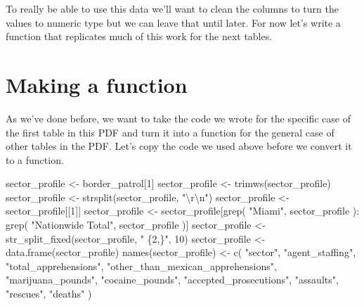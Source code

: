 \documentclass[
]{krantz}
\makeatletter
\newenvironment{Shaded}{\begin{snugshade}}{\end{snugshade}}
\newcommand{\DecValTok}[1]{\textcolor[rgb]{0.06,0.06,0.06}{#1}}
\newcommand{\FunctionTok}[1]{\textcolor[rgb]{0,0,0}{#1}}
\newcommand{\NormalTok}[1]{#1}
\newcommand{\OtherTok}[1]{\textcolor[rgb]{0.37,0.37,0.37}{#1}}
\newcommand{\SpecialCharTok}[1]{\textcolor[rgb]{0,0,0}{#1}}
\newcommand{\StringTok}[1]{\textcolor[rgb]{0.5,0.5,0.5}{#1}}
\newenvironment{kframe}{%
\medskip{}
\setlength{\fboxsep}{.8em}
 \def\at@end@of@kframe{}%
 \ifinner\ifhmode%
  \def\at@end@of@kframe{\end{minipage}}%
  \begin{minipage}{\columnwidth}%
 \fi\fi%
 \def\FrameCommand##1{\hskip\@totalleftmargin \hskip-\fboxsep
 \colorbox{shadecolor}{##1}\hskip-\fboxsep
     \hskip-\linewidth \hskip-\@totalleftmargin \hskip\columnwidth}%
 \MakeFramed {\advance\hsize-\width
   \@totalleftmargin\z@ \linewidth\hsize
   \@setminipage}}%
 {\par\unskip\endMakeFramed%
 \at@end@of@kframe}
\renewenvironment{Shaded}{\begin{kframe}}{\end{kframe}}
\makeatother
\begin{document}
To really be able to use this data we'll want to clean the
columns to turn the values to numeric type but we can leave
that until later. For now let's write a function that
replicates much of this work for the next tables.

\hypertarget{making-a-function}{%
\section{Making a function}\label{making-a-function}}

As we've done before, we want to take the code we wrote for
the specific case of the first table in this PDF and turn it
into a function for the general case of other tables in the
PDF. Let's copy the code we used above before we convert it
to a function.

\begin{Shaded}
\begin{Highlighting}[]
\NormalTok{sector\_profile }\OtherTok{\textless{}{-}}\NormalTok{ border\_patrol[}\DecValTok{1}\NormalTok{]}
\NormalTok{sector\_profile }\OtherTok{\textless{}{-}} \FunctionTok{trimws}\NormalTok{(sector\_profile)}
\NormalTok{sector\_profile }\OtherTok{\textless{}{-}} \FunctionTok{strsplit}\NormalTok{(sector\_profile, }\StringTok{"}\SpecialCharTok{\textbackslash{}r\textbackslash{}n}\StringTok{"}\NormalTok{)}
\NormalTok{sector\_profile }\OtherTok{\textless{}{-}}\NormalTok{ sector\_profile[[}\DecValTok{1}\NormalTok{]]}
\NormalTok{sector\_profile }\OtherTok{\textless{}{-}}\NormalTok{ sector\_profile[}\FunctionTok{grep}\NormalTok{(}
  \StringTok{"Miami"}\NormalTok{,}
\NormalTok{  sector\_profile}
\NormalTok{)}\SpecialCharTok{:}
\FunctionTok{grep}\NormalTok{(}
  \StringTok{"Nationwide Total"}\NormalTok{,}
\NormalTok{  sector\_profile}
\NormalTok{)]}
\NormalTok{sector\_profile }\OtherTok{\textless{}{-}} \FunctionTok{str\_split\_fixed}\NormalTok{(sector\_profile, }\StringTok{" \{2,\}"}\NormalTok{, }\DecValTok{10}\NormalTok{)}
\NormalTok{sector\_profile }\OtherTok{\textless{}{-}} \FunctionTok{data.frame}\NormalTok{(sector\_profile)}
\FunctionTok{names}\NormalTok{(sector\_profile) }\OtherTok{\textless{}{-}} \FunctionTok{c}\NormalTok{(}
  \StringTok{"sector"}\NormalTok{,}
  \StringTok{"agent\_staffing"}\NormalTok{,}
  \StringTok{"total\_apprehensions"}\NormalTok{,}
  \StringTok{"other\_than\_mexican\_apprehensions"}\NormalTok{,}
  \StringTok{"marijuana\_pounds"}\NormalTok{,}
  \StringTok{"cocaine\_pounds"}\NormalTok{,}
  \StringTok{"accepted\_prosecutions"}\NormalTok{,}
  \StringTok{"assaults"}\NormalTok{,}
  \StringTok{"rescues"}\NormalTok{,}
  \StringTok{"deaths"}
\NormalTok{)}
\end{Highlighting}
\end{Shaded}
\end{document}
